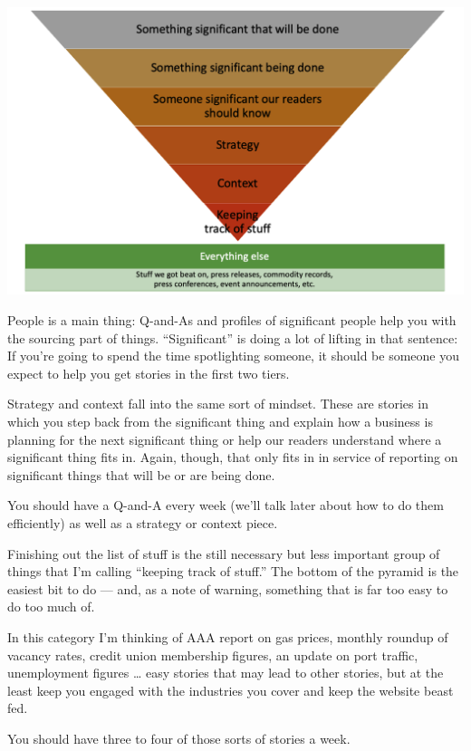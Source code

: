 \documentclass[
  12pt,
  american,
  letterpaperpaper,
  extrafontsizes,onecolumn,openright
  ]{memoir}
\begin{document}
\scriptsize

\begin{center}\includegraphics[width=0.8\linewidth]{images/story_hierarchy} \end{center}

\normalsize
People is a main thing: Q-and-As and profiles of significant people help you with the sourcing part of things. \enquote{Significant} is doing a lot of lifting in that sentence: If you're going to spend the time spotlighting someone, it should be someone you expect to help you get stories in the first two tiers.

Strategy and context fall into the same sort of mindset. These are stories in which you step back from the significant thing and explain how a business is planning for the next significant thing or help our readers understand where a significant thing fits in. Again, though, that only fits in in service of reporting on significant things that will be or are being done.

You should have a Q-and-A every week (we'll talk later about how to do them efficiently) as well as a strategy or context piece.

Finishing out the list of stuff is the still necessary but less important group of things that I'm calling \enquote{keeping track of stuff.} The bottom of the pyramid is the easiest bit to do --- and, as a note of warning, something that is far too easy to do too much of.

In this category I'm thinking of AAA report on gas prices, monthly roundup of vacancy rates, credit union membership figures, an update on port traffic, unemployment figures \ldots{} easy stories that may lead to other stories, but at the least keep you engaged with the industries you cover and keep the website beast fed.

You should have three to four of those sorts of stories a week.
\end{document}
